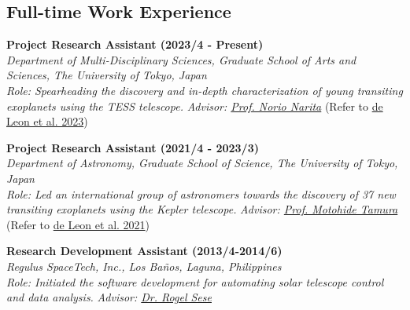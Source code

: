 \documentclass[12pt,letterpaper]{article}
\begin{document}
\subsection{Full-time Work Experience}
\begin{list}{}{\cvlist}
    \item
        \textbf{Project Research Assistant (2023/4 - Present)} \\
        \textit{Department of Multi-Disciplinary Sciences, Graduate School of Arts and Sciences, The University of Tokyo, Japan} \\
        \textit{Role: Spearheading the discovery and in-depth characterization of young transiting exoplanets using the TESS telescope.}
        \textit{Advisor: \href{\naritaurl}{Prof. Norio Narita}} (Refer to \href{\paperthree}{de Leon et al. 2023})\\

    \item
        \textbf{Project Research Assistant (2021/4 - 2023/3)} \\
        \textit{Department of Astronomy, Graduate School of Science, The University of Tokyo, Japan} \\
        \textit{Role: Led an international group of astronomers towards the discovery of 37 new transiting exoplanets using the Kepler telescope.}
        \textit{Advisor: \href{tamuraurl}{Prof. Motohide Tamura}} (Refer to \href{\papertwo}{de Leon et al. 2021})\\
        
    \item
        \textbf{Research Development Assistant (2013/4-2014/6)}\\
        \textit{Regulus SpaceTech, Inc., Los Ba\~nos, Laguna, Philippines}\\
        \textit{Role: Initiated the software development for automating solar telescope control and data analysis.}
        \textit{Advisor: \href{\seseurl}{Dr. Rogel Sese}} \\
\end{list}
\end{document}
